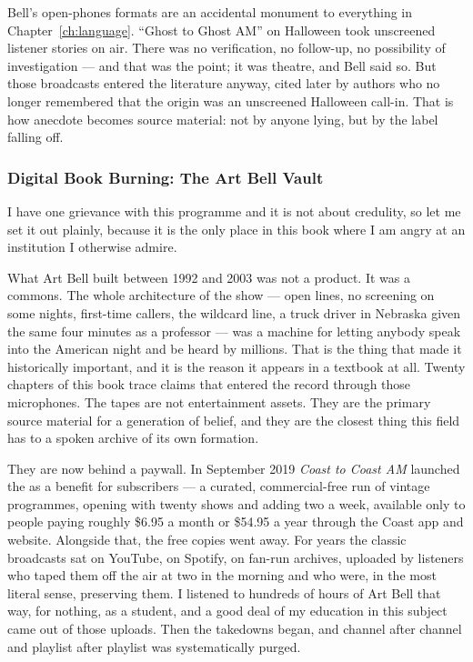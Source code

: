 \begin{funfact}
Bell's open-phones formats are an accidental monument to everything in Chapter~\ref{ch:language}.
``Ghost to Ghost AM'' on Halloween took unscreened listener stories on air. There was no verification,
no follow-up, no possibility of investigation --- and that was the point; it was theatre, and Bell said
so. But those broadcasts entered the literature anyway, cited later by authors who no longer
remembered that the origin was an unscreened Halloween call-in. That is how anecdote becomes source
material: not by anyone lying, but by the label falling off.
\end{funfact}

\subsubsection{Digital Book Burning: The Art Bell Vault}

I have one grievance with this programme and it is not about credulity, so let me set it out plainly,
because it is the only place in this book where I am angry at an institution I otherwise admire.

What Art Bell built between 1992 and 2003 was not a product. It was a commons. The whole architecture
of the show --- open lines, no screening on some nights, first-time callers, the wildcard line, a
truck driver in Nebraska given the same four minutes as a professor --- was a machine for letting
anybody speak into the American night and be heard by millions. That is the thing that made it
historically important, and it is the reason it appears in a textbook at all. Twenty chapters of this
book trace claims that entered the record through those microphones. The tapes are not entertainment
assets. They are the primary source material for a generation of belief, and they are the closest
thing this field has to a spoken archive of its own formation.

They are now behind a paywall. In September 2019 \emph{Coast to Coast AM} launched the
 as a benefit for  subscribers --- a curated, commercial-free
run of vintage programmes, opening with twenty shows and adding two a week, available only to people
paying roughly \$6.95 a month or \$54.95 a year through the Coast app and website. Alongside that, the
free copies went away. For years the classic broadcasts sat on YouTube, on Spotify, on fan-run
archives, uploaded by listeners who taped them off the air at two in the morning and who were, in the
most literal sense, preserving them. I listened to hundreds of hours of Art Bell that way, for nothing,
as a student, and a good deal of my education in this subject came out of those uploads. Then the
takedowns began, and channel after channel and playlist after playlist was systematically purged.

